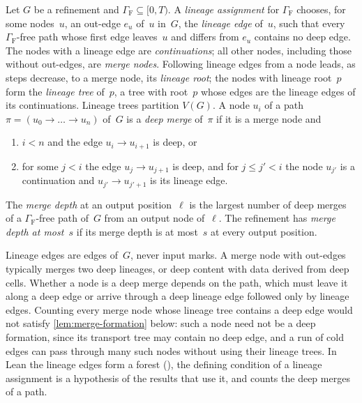 \begin{definition}\label{def:lineage}
Let $G$ be a refinement and $\Gamma_{\mathrm F}\subseteq[0,T)$. A \emph{lineage assignment} for $\Gamma_{\mathrm F}$
chooses, for some nodes~$u$, an out-edge $e_u$ of~$u$ in~$G$, the \emph{lineage edge} of~$u$, such that every
$\Gamma_{\mathrm F}$-free path whose first edge leaves~$u$ and differs from $e_u$ contains no deep edge. The nodes with a
lineage edge are \emph{continuations}; all other nodes, including those without out-edges, are \emph{merge nodes}.
Following lineage edges from a node leads, as steps decrease, to a merge node, its \emph{lineage root}; the nodes with
lineage root~$p$ form the \emph{lineage tree} of~$p$, a tree with root~$p$ whose edges are the lineage edges of its
continuations. Lineage trees partition $V(G)$. A node $u_i$ of a path $\pi=(u_0\to\dots\to u_n)$ of~$G$ is a \emph{deep
merge} of~$\pi$ if it is a merge node and
\begin{enumerate}
\item[($\alpha$)] $i<n$ and the edge $u_i\to u_{i+1}$ is deep, or
\item[($\beta$)] for some $j<i$ the edge $u_j\to u_{j+1}$ is deep, and for $j\le j'<i$ the node $u_{j'}$ is a
continuation and $u_{j'}\to u_{j'+1}$ is its lineage edge.
\end{enumerate}
The \emph{merge depth} at an output position~$\ell$ is the largest number of deep merges of a
$\Gamma_{\mathrm F}$-free path of~$G$ from an output node of~$\ell$. The refinement has \emph{merge depth at most~$s$}
if its merge depth is at most~$s$ at every output position.
\end{definition}

Lineage edges are edges of~$G$, never input marks. A merge node with out-edges typically merges two deep lineages, or
deep content with data derived from deep cells. Whether a node is a deep merge depends on the path, which must leave it
along a deep edge or arrive through a deep lineage edge followed only by lineage edges. Counting every merge node whose
lineage tree contains a deep edge would not satisfy \cref{lem:merge-formation} below: such a node need not be a deep
formation, since its transport tree may contain no deep edge, and a run of cold edges can pass through many such nodes
without using their lineage trees. In Lean the lineage edges form a forest (), the defining
condition of a lineage assignment is a hypothesis of the results that use it, and  counts the deep
merges of a path.

